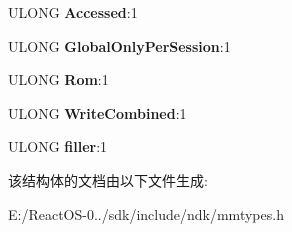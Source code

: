 \begin{DoxyCompactItemize}
U\+L\+O\+NG {\bfseries Accessed}\+:1
\item 
\mbox{\label{struct___m_m_s_e_c_t_i_o_n___f_l_a_g_s_ab1f548763c5a5c98508e7f9d879f8797}} 
U\+L\+O\+NG {\bfseries Global\+Only\+Per\+Session}\+:1
\item 
\mbox{\label{struct___m_m_s_e_c_t_i_o_n___f_l_a_g_s_a5c68b3a228a37bf8b8a794c44fe2315d}} 
U\+L\+O\+NG {\bfseries Rom}\+:1
\item 
\mbox{\label{struct___m_m_s_e_c_t_i_o_n___f_l_a_g_s_a9c16a4feec77a158b3339156030b6590}} 
U\+L\+O\+NG {\bfseries Write\+Combined}\+:1
\item 
\mbox{\label{struct___m_m_s_e_c_t_i_o_n___f_l_a_g_s_ab0c3452e62ce416a3eb435a204f0eef3}} 
U\+L\+O\+NG {\bfseries filler}\+:1
\end{DoxyCompactItemize}


该结构体的文档由以下文件生成\+:\begin{DoxyCompactItemize}
\item 
E\+:/\+React\+O\+S-\/0../sdk/include/ndk/mmtypes.\+h\end{DoxyCompactItemize}
